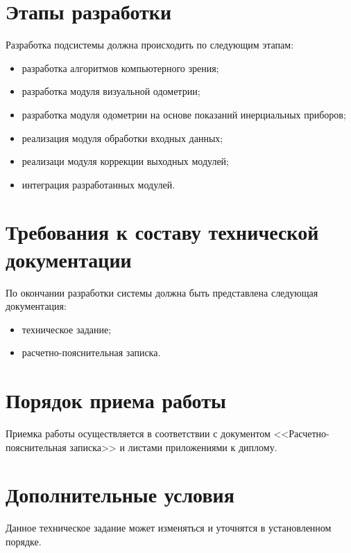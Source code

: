 \documentclass
[a4paper,14pt,russian]{article}
\begin{document}
\section{Этапы разработки}
Разработка подсистемы должна происходить по следующим этапам:
\begin{itemize}
\item разработка алгоритмов компьютерного зрения; 
\item разработка модуля визуальной одометрии;
\item разработка модуля одометрии на основе показаний инерциальных приборов;
\item реализация модуля обработки входных данных;
\item реализаци модуля коррекции выходных модулей;
\item интеграция разработанных модулей.
\end{itemize}

\section{Требования к составу технической документации}
По окончании разработки системы должна быть представлена следующая документация:
\begin{itemize}
\item техническое задание;
\item расчетно-пояснительная записка.
\end{itemize}

\section{Порядок приема работы}
Приемка работы осуществляется в соответствии с документом <<Расчетно-пояснительная записка>> и листами приложениями к диплому.

\section{Дополнительные условия}
Данное техническое задание может изменяться и уточнятся в установленном порядке.
\end{document}
